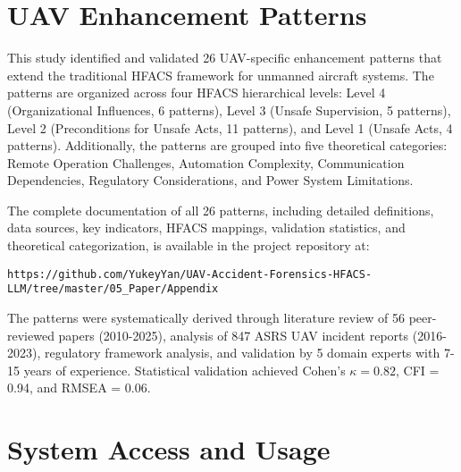 
\appendix
\section{UAV Enhancement Patterns}
\label{appendix:uav_patterns}

This study identified and validated 26 UAV-specific enhancement patterns that extend the traditional HFACS framework for unmanned aircraft systems. The patterns are organized across four HFACS hierarchical levels: Level 4 (Organizational Influences, 6 patterns), Level 3 (Unsafe Supervision, 5 patterns), Level 2 (Preconditions for Unsafe Acts, 11 patterns), and Level 1 (Unsafe Acts, 4 patterns). Additionally, the patterns are grouped into five theoretical categories: Remote Operation Challenges, Automation Complexity, Communication Dependencies, Regulatory Considerations, and Power System Limitations.

The complete documentation of all 26 patterns, including detailed definitions, data sources, key indicators, HFACS mappings, validation statistics, and theoretical categorization, is available in the project repository at:

\texttt{https://github.com/YukeyYan/UAV-Accident-Forensics-HFACS-LLM/tree/master/05\_Paper/Appendix}

The patterns were systematically derived through literature review of 56 peer-reviewed papers (2010-2025), analysis of 847 ASRS UAV incident reports (2016-2023), regulatory framework analysis, and validation by 5 domain experts with 7-15 years of experience. Statistical validation achieved Cohen's $\kappa = 0.82$, CFI = 0.94, and RMSEA = 0.06.

\section{System Access and Usage}
\label{appendix:system_access}

